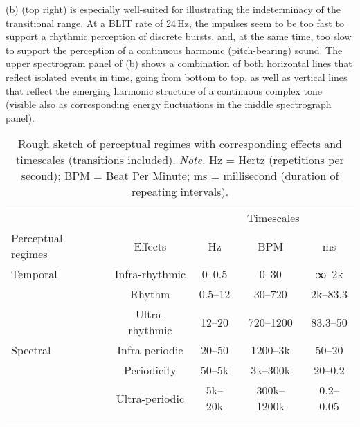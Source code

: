 (b) (top right) is especially well-suited for illustrating the indeterminacy of the transitional range. At a BLIT rate of 24\,Hz, the impulses seem to be too fast to support a rhythmic perception of discrete bursts, and, at the same time, too slow to support the perception of a continuous harmonic (pitch-bearing) sound. The upper spectrogram panel of (b) shows a combination of both horizontal lines that reflect isolated events in time, going from bottom to top, as well as vertical lines that reflect the emerging harmonic structure of a continuous complex tone (visible also as corresponding energy fluctuations in the middle spectrograph panel).

\begin{table}
\caption{\label{tab:transitionalTimeScales}Rough sketch of perceptual regimes with corresponding effects and timescales (transitions included). \textit{Note.} Hz = Hertz (repetitions per second); BPM = Beat Per Minute; ms = millisecond (duration of repeating intervals).}
\begin{tabular}{lcccc}
\lsptoprule
& & \multicolumn{3}{c}{Timescales}\\\cmidrule(lr){3-5}
Perceptual regimes & Effects &  Hz & BPM & ms \\\midrule

Temporal & \multicolumn{1}{c}{\color{gray}Infra-rhythmic} & \multicolumn{1}{c}{\color{gray}0--0.5} & \multicolumn{1}{c}{\color{gray}0--30} & \multicolumn{1}{c}{\color{gray}∞--2k} \\
   & \multicolumn{1}{c}{Rhythm} & \multicolumn{1}{c}{0.5--12} & \multicolumn{1}{c}{30--720} & \multicolumn{1}{c}{2k--83.3} \\
   & \multicolumn{1}{c}{\color{gray}Ultra-rhythmic} & \multicolumn{1}{c}{\color{gray}12--20} & \multicolumn{1}{c}{\color{gray}720--1200} & \multicolumn{1}{c}{\color{gray}83.3--50} \\\midrule
Spectral & \multicolumn{1}{c}{\color{gray}Infra-periodic} & \multicolumn{1}{c}{\color{gray}20--50} & \multicolumn{1}{c}{\color{gray}1200--3k} & \multicolumn{1}{c}{\color{gray}50--20} \\
   & \multicolumn{1}{c}{Periodicity} & \multicolumn{1}{c}{50--5k} & \multicolumn{1}{c}{3k--300k} & \multicolumn{1}{c}{20--0.2} \\
   & \multicolumn{1}{c}{\color{gray}Ultra-periodic} & \multicolumn{1}{c}{\color{gray}5k--20k} & \multicolumn{1}{c}{\color{gray}300k--1200k} & \multicolumn{1}{c}{\color{gray}0.2--0.05} \\
\lspbottomrule
\end{tabular}
\end{table}

